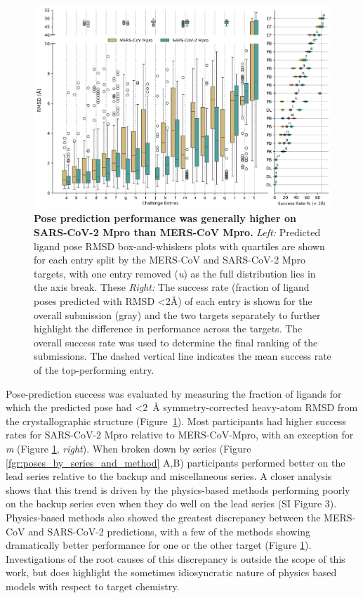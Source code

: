 \documentclass[journal=jcim,manuscript=article]{achemso}
\begin{document}
\begin{figure}
    \includegraphics[width=6in
    ]{fig6_poses_leaderboard/Figure.png}
  \caption{\textbf{Pose prediction performance was generally higher on SARS-CoV-2 Mpro than MERS-CoV Mpro.}
 \emph{Left:} Predicted ligand pose RMSD box-and-whiskers plots with quartiles are shown for each entry split by the MERS-CoV and SARS-CoV-2 Mpro targets, with one entry removed (\textit{u}) as the full distribution lies in the axis break. These \emph{Right:} The success rate (fraction of ligand poses predicted with RMSD \textless2Å) of each entry is shown for the overall submission (gray) and the two targets separately to further highlight the difference in performance across the targets. The overall success rate was used to determine the final ranking of the submissions. The dashed vertical line indicates the mean success rate of the top-performing entry.}
  \label{fgr:poses_leaderboard}
\end{figure}

Pose-prediction success was evaluated by measuring the fraction of ligands for which the predicted pose had \textless 2~Å symmetry-corrected heavy-atom RMSD from the crystallographic structure (Figure~\ref{fgr:poses_leaderboard}). Most participants had higher success rates for SARS-CoV-2 Mpro relative to MERS-CoV-Mpro, with an exception for \textit{m} (Figure \ref{fgr:poses_leaderboard}, \emph{right}). When broken down by series (Figure \ref{fgr:poses_by_series_and_method} A,B) participants performed better on the lead series relative to the backup and miscellaneous series. A closer analysis shows that this trend is driven by the physics-based methods performing poorly on the backup series even when they do well on the lead series (SI Figure 3). Physics-based methods also showed the greatest discrepancy between the MERS-CoV and SARS-CoV-2 predictions, with a few of the methods showing dramatically better performance for one or the other target (Figure \ref{fgr:poses_leaderboard}). Investigations of the root causes of this discrepancy is outside the scope of this work, but does highlight the sometimes idiosyncratic nature of physics based models with respect to target chemistry\cite{ross_maximal_2023}.
\end{document}
